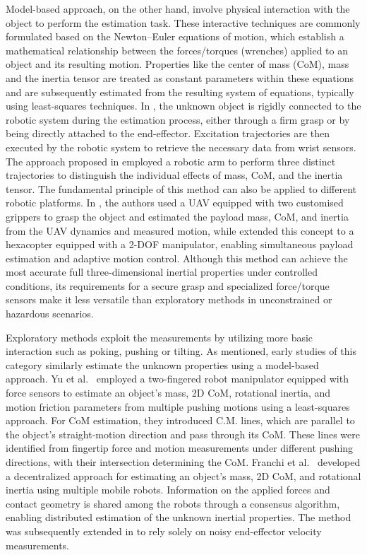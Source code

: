 Model-based approach, on the other hand, involve physical interaction with the object to perform the estimation task. These interactive techniques are commonly formulated based on the Newton--Euler equations of motion, which establish a mathematical relationship between the forces/torques (wrenches) applied to an object and its resulting motion. Properties like the center of mass (CoM), mass and the inertia tensor are treated as constant parameters within these equations and are subsequently estimated from the resulting system of equations, typically using least-squares techniques. In \cite{Khosla1985Parameter,Swevers2007Dynamic,Gautier1997Dynamic}, the unknown object is rigidly connected to the robotic system during the estimation process, either through a firm grasp or by being directly attached to the end-effector. Excitation trajectories are then executed by the robotic system to retrieve the necessary data from wrist sensors. The approach proposed in \cite{Dong2018Payload} employed a robotic arm to perform three distinct trajectories to distinguish the individual effects of mass, CoM, and the inertia tensor. The fundamental principle of this method can also be applied to different robotic platforms. In \cite{Mellinger2011Aerial}, the authors used a UAV equipped with two customised grippers to grasp the object and estimated the payload mass, CoM, and inertia from the UAV dynamics and measured motion, while \cite{Lee2017AerialTransportation} extended this concept to a hexacopter equipped with a 2-DOF manipulator, enabling simultaneous payload estimation and adaptive motion control. Although this method can achieve the most accurate full three-dimensional inertial properties under controlled conditions, its requirements for a secure grasp and specialized force/torque sensors make it less versatile than exploratory methods in unconstrained or hazardous scenarios.

Exploratory methods exploit the measurements by utilizing more basic interaction such as poking, pushing or tilting. As mentioned, early studies of this category similarly estimate the unknown properties using a model-based approach. Yu et al.~\cite{Yu2005Pushing} employed a two-fingered robot manipulator equipped with force sensors to estimate an object's mass, 2D CoM, rotational inertia, and motion friction parameters from multiple pushing motions using a least-squares approach. For CoM estimation, they introduced C.M. lines, which are parallel to the object's straight-motion direction and pass through its CoM. These lines were identified from fingertip force and motion measurements under different pushing directions, with their intersection determining the CoM. Franchi et al.~\cite{Franchi2014Distributed} developed a decentralized approach for estimating an object's mass, 2D CoM, and rotational inertia using multiple mobile robots. Information on the applied forces and contact geometry is shared among the robots through a consensus algorithm, enabling distributed estimation of the unknown inertial properties. The method was subsequently extended in \cite{Franchi2016Decentralized} to rely solely on noisy end-effector velocity measurements.

